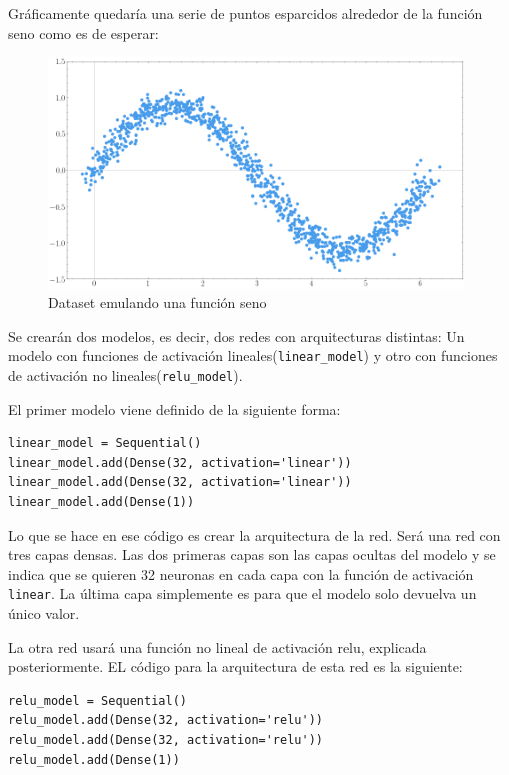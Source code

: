 Gráficamente quedaría una serie de puntos esparcidos alrededor de la función seno como es de esperar:
\begin{figure}[H]
    \centering
    \includegraphics[width=11cm]{images/state-of-art/activation-functions/sin.png}
    \caption{Dataset emulando una función seno}
    \label{fig:basicneuron}
\end{figure}

Se crearán dos modelos, es decir, dos redes con arquitecturas distintas: Un modelo con funciones de activación lineales(\verb|linear_model|) y otro con funciones de activación no lineales(\verb|relu_model|).
\newline

El primer modelo viene definido de la siguiente forma:

\begin{verbatim}
linear_model = Sequential()
linear_model.add(Dense(32, activation='linear'))
linear_model.add(Dense(32, activation='linear'))
linear_model.add(Dense(1))
\end{verbatim}

Lo que se hace en ese código es crear la arquitectura de la red. Será una red con tres capas densas. Las dos primeras capas son las capas ocultas del modelo y se indica que se quieren 32 neuronas en cada capa con la función de activación \verb|linear|. La última capa simplemente es para que el modelo solo devuelva un único valor.
\newline

La otra red usará una función no lineal de activación \acrshort{relu}, explicada posteriormente. EL código para la arquitectura de esta red es la siguiente:
\begin{verbatim}
relu_model = Sequential()
relu_model.add(Dense(32, activation='relu'))
relu_model.add(Dense(32, activation='relu'))
relu_model.add(Dense(1))
\end{verbatim}


